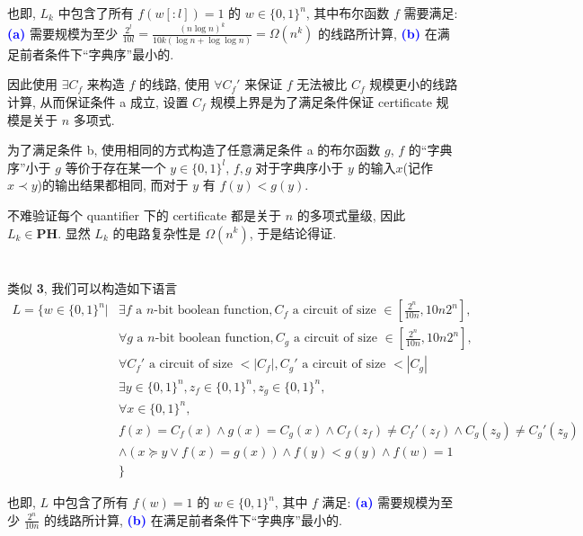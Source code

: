 \documentclass[8pt]{article}
\theoremstyle{compact}
\def\num#1{\textnormal{\textbf{\mbox{\textcolor{blue}{(#1)}}}}}
\begin{document}
也即, $L_k$ 中包含了所有 $f(w[:l]) = 1$ 的 $w \in \{0, 1\}^n$, 其中布尔函数 $f$ 需要满足: \num{a} 需要规模为至少 $\frac{2^l}{10l} = \frac{(n\log n)^k}{10k(\log n + \log\log n)} = \Omega(n^k)$ 的线路所计算, \num{b} 在满足前者条件下“字典序”最小的.

因此使用 $\exists C_f$ 来构造 $f$ 的线路, 使用 $\forall C_f'$ 来保证 $f$ 无法被比 $C_f$ 规模更小的线路计算, 从而保证条件 a 成立, 设置 $C_f$ 规模上界是为了满足条件保证 certificate 规模是关于 $n$ 多项式. 

为了满足条件 b, 使用相同的方式构造了任意满足条件 a 的布尔函数 $g$, $f$ 的“字典序”小于 $g$ 等价于存在某一个 $y \in \{0, 1\}^l$, $f, g$ 对于字典序小于 $y$ 的输入$x$(记作 $x \prec y$)的输出结果都相同, 而对于 $y$ 有 $f(y) < g(y)$.

不难验证每个 quantifier 下的 certificate 都是关于 $n$ 的多项式量级, 因此 $L_k \in \textbf{PH}$. 显然 $L_k$ 的电路复杂性是 $\Omega(n^k)$, 于是结论得证.

\section{}
类似 \textbf{3}, 我们可以构造如下语言\begin{equation*}
	\begin{split}
		L = \{w \in \{0, 1\}^n | &\exists f \text{ a } n \text{-bit boolean function}, C_f \text{ a circuit of size } \in \left[\frac{2^n}{10n}, 10n2^n\right], \\
		&\forall g \text{ a } n \text{-bit boolean function}, C_g \text{ a circuit of size } \in \left[\frac{2^n}{10n}, 10n2^n\right], \\ &\forall C_f' \text{ a circuit of size } < |C_f|, C_g' \text{ a circuit of size } < |C_g|\\
		&\exists y \in \{0, 1\}^n, z_f \in \{0, 1\}^n, z_g \in \{0, 1\}^n,\\
		&\forall x \in \{0, 1\}^n, \\
		&f(x) = C_f(x) \wedge g(x) = C_g(x) \wedge C_f(z_f) \neq C_f'(z_f) \wedge C_g(z_g) \neq C_g'(z_g) \\ &\wedge(x \succcurlyeq y \vee f(x) = g(x)) \wedge f(y) < g(y) \wedge f(w) = 1\\
		&\}
	\end{split}
\end{equation*}

也即, $L$ 中包含了所有 $f(w) = 1$ 的 $w \in \{0, 1\}^n$, 其中 $f$ 满足: \num{a} 需要规模为至少 $\frac{2^n}{10n}$ 的线路所计算, \num{b} 在满足前者条件下“字典序”最小的. 
\end{document}
